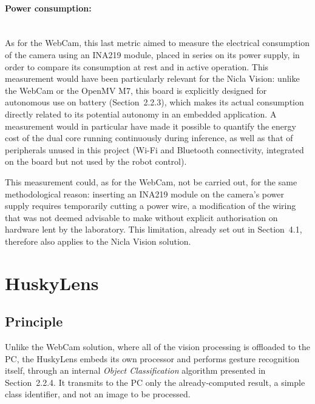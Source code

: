 \documentclass[12pt,a4paper]{report}
\begin{document}
	\newpage
	
	
	\paragraph{Power consumption:} \mbox{} \\
	As for the WebCam, this last metric aimed to measure the electrical consumption of the camera using an INA219 module, placed in series on its power supply, in order to compare its consumption at rest and in active operation. This measurement would have been particularly relevant for the Nicla Vision: unlike the WebCam or the OpenMV M7, this board is explicitly designed for autonomous use on battery (Section~2.2.3), which makes its actual consumption directly related to its potential autonomy in an embedded application. A measurement would in particular have made it possible to quantify the energy cost of the dual core running continuously during inference, as well as that of peripherals unused in this project (Wi-Fi and Bluetooth connectivity, integrated on the board but not used by the robot control).
	
	This measurement could, as for the WebCam, not be carried out, for the same methodological reason: inserting an INA219 module on the camera's power supply requires temporarily cutting a power wire, a modification of the wiring that was not deemed advisable to make without explicit authorisation on hardware lent by the laboratory. This limitation, already set out in Section~4.1, therefore also applies to the Nicla Vision solution.
	
	\newpage
	
	
	\section{HuskyLens}
	
	\subsection*{Principle}
	
	Unlike the WebCam solution, where all of the vision processing is offloaded to the PC, the HuskyLens embeds its own processor and performs gesture recognition itself, through an internal \textit{Object Classification} algorithm presented in Section~2.2.4. It transmits to the PC only the already-computed result, a simple class identifier, and not an image to be processed.
	
\end{document}
